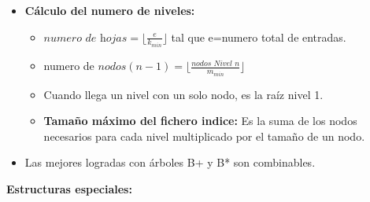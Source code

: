\documentclass[12pt, twoside, openright]{report} %
\begin{document}
\begin{itemize}
\begin{itemize}
    \item \textbf{Cálculo del numero de niveles:}
      

      \begin{itemize}
      \item $\textit{numero de hojas}= \lfloor \frac{e}{k_{min}} \rfloor$ tal que e=numero total de
        entradas.
        
      \item numero de $nodos(n-1) = \lfloor \frac{\textit{nodos Nivel n}}{m_{min}} \rfloor$
        
      \item Cuando llega un nivel con un solo nodo, es la raíz nivel 1.
        
      \item \textbf{Tamaño máximo del fichero indice:} Es la suma de los
        nodos necesarios para cada nivel multiplicado por el tamaño de
        un nodo.
        
      \end{itemize}
    \item Las mejores logradas con árboles B+ y B* son combinables.
      
    \end{itemize}
  \end{itemize}

  
  \textbf{Estructuras especiales:}
  
\end{document}
